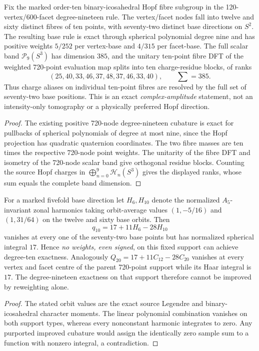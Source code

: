 \documentclass[12pt,a4paper]{article}
\begin{document}
\begin{theorem}
\label{p2d:thm:cc20-72-base9}
Fix the marked order-ten binary-icosahedral Hopf fibre subgroup in the
120-vertex/600-facet degree-nineteen rule.  The vertex/facet nodes
fall into twelve and sixty distinct fibres of ten points, with
seventy-two distinct base directions on $S^2$.  The resulting base rule
is exact through spherical polynomial degree nine and has positive
weights $5/252$ per vertex-base and $4/315$ per facet-base.  The
full scalar band $\mathcal P_9(S^3)$ has dimension $385$, and the
unitary ten-point fibre DFT of the weighted 720-point evaluation map
splits into ten charge-residue blocks, of ranks
\[
 \boxed{(25,40,33,46,37,48,37,46,33,40),\qquad\sum=385.}
\]
Thus charge aliases on individual ten-point fibres are resolved by
the full set of seventy-two base positions.  This is an exact
\emph{complex-amplitude} statement, not an intensity-only tomography
or a physically preferred Hopf direction.
\end{theorem}
\begin{proof}
The existing positive 720-node degree-nineteen cubature is exact for
pullbacks of spherical polynomials of degree at most nine, since the
Hopf projection has quadratic quaternion coordinates.  The two
fibre masses are ten times the respective 720-node point weights.
The unitarity of the fibre DFT and isometry of the 720-node scalar
band give orthogonal residue blocks.  Counting the source Hopf
charges in $\bigoplus_{n=0}^9\mathcal H_n(S^3)$ gives the displayed
ranks, whose sum equals the complete band dimension.
\end{proof}
\begin{proposition}
\label{p2d:prop:cc20-fixed-support-no-go}
For a marked fivefold base direction let $H_6,H_{10}$ denote the
normalized $A_5$-invariant zonal harmonics taking orbit-average
values $(1,-5/16)$ and $(1,31/64)$ on the twelve and sixty base
orbits.  Then
\[
 q_{10}=17+11H_6-28H_{10}
\]
vanishes at every one of the seventy-two base points but has
normalized spherical integral $17$.  Hence \emph{no weights, even
signed}, on this fixed support can achieve degree-ten exactness.
Analogously $Q_{20}=17+11C_{12}-28C_{20}$ vanishes at every vertex and
facet centre of the parent 720-point support while its Haar integral
is $17$.  The degree-nineteen exactness on that support therefore
cannot be improved by reweighting alone.
\end{proposition}
\begin{proof}
The stated orbit values are the exact source Legendre and
binary-icosahedral character moments.  The linear polynomial
combination vanishes on both support types, whereas every
nonconstant harmonic integrates to zero.  Any purported improved
cubature would assign the identically zero sample sum to a function
with nonzero integral, a contradiction.
\end{proof}
\end{document}
